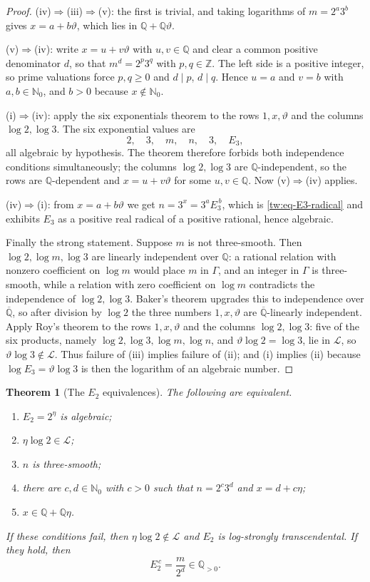 \documentclass[11pt,oneside]{article}
\newtheorem{theorem}{Theorem}[section]
\theoremstyle{definition}
\theoremstyle{remark}
\newcommand{\Nzero}{\mathbb N_0}
\newcommand{\Z}{\mathbb Z}
\newcommand{\Q}{\mathbb Q}
\newcommand{\Abar}{\overline{\mathbb Q}}
\newcommand{\thetaq}{\vartheta}
\newcommand{\LL}{\mathcal L}
\newcommand{\GammaSat}{\Gamma}
\begin{document}
\begin{proof}
(iv)$\Rightarrow$(iii)$\Rightarrow$(v): the first is trivial, and taking logarithms of
$m=2^a3^b$ gives $x=a+b\thetaq$, which lies in $\Q+\Q\thetaq$.

(v)$\Rightarrow$(iv): write $x=u+v\thetaq$ with $u,v\in\Q$ and clear a common positive
denominator $d$, so that $m^d=2^p3^q$ with $p,q\in\Z$.  The left side is a positive integer,
so prime valuations force $p,q\ge0$ and $d\mid p$, $d\mid q$.  Hence $u=a$ and $v=b$ with
$a,b\in\Nzero$, and $b>0$ because $x\notin\Nzero$.

(i)$\Rightarrow$(iv): apply the six exponentials theorem to the rows $1,x,\thetaq$ and the
columns $\log2,\log3$.  The six exponential values are
\[
 2,\quad3,\quad m,\quad n,\quad3,\quad E_3,
\]
all algebraic by hypothesis.  The theorem therefore forbids both independence conditions
simultaneously; the columns $\log2,\log3$ are $\Q$-independent, so the rows are $\Q$-dependent
and $x=u+v\thetaq$ for some $u,v\in\Q$.  Now (v)$\Rightarrow$(iv) applies.

(iv)$\Rightarrow$(i): from $x=a+b\thetaq$ we get $n=3^x=3^aE_3^{\,b}$, which is
\eqref{tw:eq-E3-radical} and exhibits $E_3$ as a positive real radical of a positive rational,
hence algebraic.

Finally the strong statement.  Suppose $m$ is not three-smooth.  Then $\log2,\log m,\log3$ are
linearly independent over $\Q$: a rational relation with nonzero coefficient on $\log m$ would
place $m$ in $\GammaSat$, and an integer in $\GammaSat$ is three-smooth, while a relation with
zero coefficient on $\log m$ contradicts the independence of $\log2,\log3$.  Baker's theorem
upgrades this to independence over $\Abar$, so after division by $\log2$ the three numbers
$1,x,\thetaq$ are $\Abar$-linearly independent.  Apply Roy's theorem to the rows $1,x,\thetaq$
and the columns $\log2,\log3$: five of the six products, namely
$\log2,\log3,\log m,\log n$, and $\thetaq\log2=\log3$, lie in $\LL$, so
$\thetaq\log3\notin\LL$.  Thus failure of (iii) implies failure of (ii); and (i) implies (ii)
because $\log E_3=\thetaq\log3$ is then the logarithm of an algebraic number.
\end{proof}

\begin{theorem}[The $E_2$ equivalences]
\label{tw:E2}
The following are equivalent.
\begin{enumerate}[label=\textup{(\roman*)}]
\item $E_2=2^{\eta}$ is algebraic;
\item $\eta\log2\in\LL$;
\item $n$ is three-smooth;
\item there are $c,d\in\Nzero$ with $c>0$ such that $n=2^c3^d$ and $x=d+c\eta$;
\item $x\in\Q+\Q\eta$.
\end{enumerate}
If these conditions fail, then $\eta\log2\notin\LL$ and $E_2$ is log-strongly transcendental.
If they hold, then
\begin{equation}
 E_2^{\,c}=\frac{m}{2^d}\in\Q_{>0}.
 \label{tw:eq-E2-radical}
\end{equation}
\end{theorem}
\end{document}
